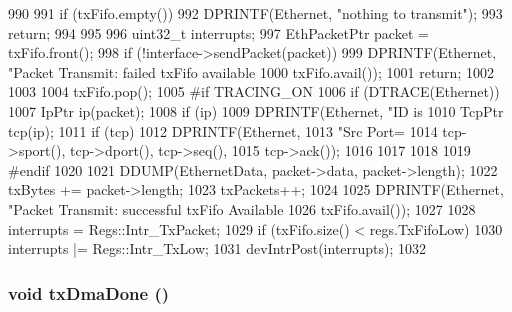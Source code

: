 \begin{DoxyCode}
990 {
991     if (txFifo.empty()) {
992         DPRINTF(Ethernet, "nothing to transmit\n");
993         return;
994     }
995 
996     uint32_t interrupts;
997     EthPacketPtr packet = txFifo.front();
998     if (!interface->sendPacket(packet)) {
999         DPRINTF(Ethernet, "Packet Transmit: failed txFifo available %
1000                 txFifo.avail());
1001         return;
1002     }
1003 
1004     txFifo.pop();
1005 #if TRACING_ON
1006     if (DTRACE(Ethernet)) {
1007         IpPtr ip(packet);
1008         if (ip) {
1009             DPRINTF(Ethernet, "ID is %
1010             TcpPtr tcp(ip);
1011             if (tcp) {
1012                 DPRINTF(Ethernet,
1013                         "Src Port=%
1014                         tcp->sport(), tcp->dport(), tcp->seq(),
1015                         tcp->ack());
1016             }
1017         }
1018     }
1019 #endif
1020 
1021     DDUMP(EthernetData, packet->data, packet->length);
1022     txBytes += packet->length;
1023     txPackets++;
1024 
1025     DPRINTF(Ethernet, "Packet Transmit: successful txFifo Available %
1026             txFifo.avail());
1027 
1028     interrupts = Regs::Intr_TxPacket;
1029     if (txFifo.size() < regs.TxFifoLow)
1030         interrupts |= Regs::Intr_TxLow;
1031     devIntrPost(interrupts);
1032 }
\end{DoxyCode}
\hypertarget{classSinic_1_1Device_a5204e0ceaa6484825f9506e447e072c6}{
\subsubsection[{txDmaDone}]{\setlength{\rightskip}{0pt plus 5cm}void txDmaDone ()}}
\label{classSinic_1_1Device_a5204e0ceaa6484825f9506e447e072c6}



